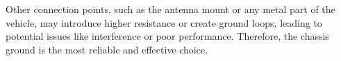Other connection points, such as the antenna mount or any metal part of the vehicle, may introduce higher resistance or create ground loops, leading to potential issues like interference or poor performance. Therefore, the chassis ground is the most reliable and effective choice.

